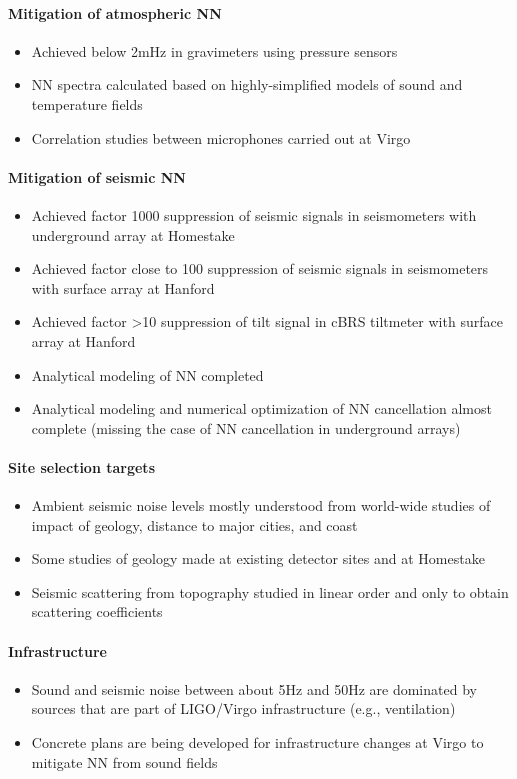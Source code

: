 \paragraph{Mitigation of atmospheric NN}
\begin{itemize}
\item Achieved below 2mHz in gravimeters using pressure sensors
\item NN spectra calculated based on highly-simplified models of sound and temperature fields
\item Correlation studies between microphones carried out at Virgo
\end{itemize}

\paragraph{Mitigation of seismic NN}
\begin{itemize}
\item Achieved factor 1000 suppression of seismic signals in seismometers with underground array at Homestake
\item Achieved factor close to 100 suppression of seismic signals in seismometers with surface array at Hanford
\item Achieved factor >10 suppression of tilt signal in cBRS tiltmeter with surface array at Hanford
\item Analytical modeling of NN completed
\item Analytical modeling and numerical optimization of NN cancellation almost complete (missing the case of NN cancellation in underground arrays)
\end{itemize}

\paragraph{Site selection targets}
\begin{itemize}
\item Ambient seismic noise levels mostly understood from world-wide studies of impact of geology, distance to major cities, and coast
\item Some studies of geology made at existing detector sites and at Homestake
\item Seismic scattering from topography studied in linear order and only to obtain scattering coefficients
\end{itemize}

\paragraph{Infrastructure}
\begin{itemize}
\item Sound and seismic noise between about 5Hz and 50Hz are dominated by sources that are part of LIGO/Virgo infrastructure (e.g., ventilation)
\item Concrete plans are being developed for infrastructure changes at Virgo to mitigate NN from sound fields 
\end{itemize}

